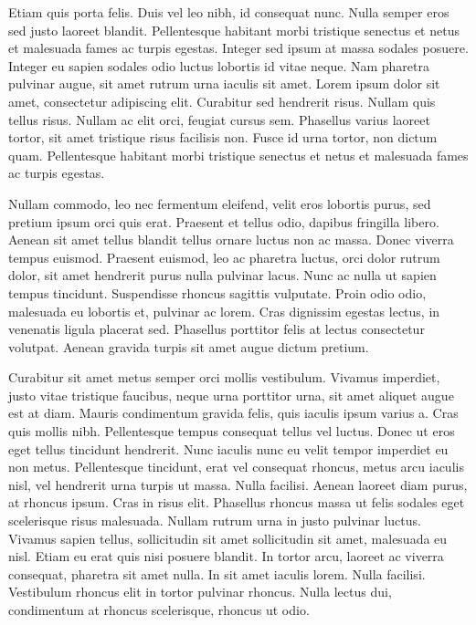 Etiam quis porta felis.
Duis vel leo nibh, id consequat nunc.
Nulla semper eros sed justo laoreet blandit.
Pellentesque habitant morbi tristique senectus et netus et malesuada fames ac turpis egestas.
Integer sed ipsum at massa sodales posuere.
Integer eu sapien sodales odio luctus lobortis id vitae neque.
Nam pharetra pulvinar augue, sit amet rutrum urna iaculis sit amet.
Lorem ipsum dolor sit amet, consectetur adipiscing elit.
Curabitur sed hendrerit risus.
Nullam quis tellus risus.
Nullam ac elit orci, feugiat cursus sem.
Phasellus varius laoreet tortor, sit amet tristique risus facilisis non.
Fusce id urna tortor, non dictum quam.
Pellentesque habitant morbi tristique senectus et netus et malesuada fames ac turpis egestas.

Nullam commodo, leo nec fermentum eleifend, velit eros lobortis purus, sed pretium ipsum orci quis erat.
Praesent et tellus odio, dapibus fringilla libero.
Aenean sit amet tellus blandit tellus ornare luctus non ac massa.
Donec viverra tempus euismod.
Praesent euismod, leo ac pharetra luctus, orci dolor rutrum dolor, sit amet hendrerit purus nulla pulvinar lacus.
Nunc ac nulla ut sapien tempus tincidunt.
Suspendisse rhoncus sagittis vulputate.
Proin odio odio, malesuada eu lobortis et, pulvinar ac lorem.
Cras dignissim egestas lectus, in venenatis ligula placerat sed.
Phasellus porttitor felis at lectus consectetur volutpat.
Aenean gravida turpis sit amet augue dictum pretium.

Curabitur sit amet metus semper orci mollis vestibulum.
Vivamus imperdiet, justo vitae tristique faucibus, neque urna porttitor urna, sit amet aliquet augue est at diam.
Mauris condimentum gravida felis, quis iaculis ipsum varius a.
Cras quis mollis nibh.
Pellentesque tempus consequat tellus vel luctus.
Donec ut eros eget tellus tincidunt hendrerit.
Nunc iaculis nunc eu velit tempor imperdiet eu non metus.
Pellentesque tincidunt, erat vel consequat rhoncus, metus arcu iaculis nisl, vel hendrerit urna turpis ut massa.
Nulla facilisi.
Aenean laoreet diam purus, at rhoncus ipsum.
Cras in risus elit.
Phasellus rhoncus massa ut felis sodales eget scelerisque risus malesuada.
Nullam rutrum urna in justo pulvinar luctus.
Vivamus sapien tellus, sollicitudin sit amet sollicitudin sit amet, malesuada eu nisl.
Etiam eu erat quis nisi posuere blandit.
In tortor arcu, laoreet ac viverra consequat, pharetra sit amet nulla.
In sit amet iaculis lorem.
Nulla facilisi.
Vestibulum rhoncus elit in tortor pulvinar rhoncus.
Nulla lectus dui, condimentum at rhoncus scelerisque, rhoncus ut odio.

